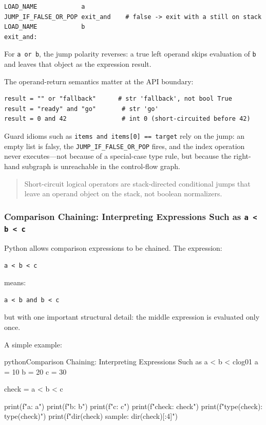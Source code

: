 \begin{verbatim}
LOAD_NAME            a
JUMP_IF_FALSE_OR_POP exit_and    # false -> exit with a still on stack
LOAD_NAME            b
exit_and:
\end{verbatim}

For \texttt{a or b}, the jump polarity reverses: a true left operand skips evaluation of \texttt{b} and leaves that object as the expression result.

The operand-return semantics matter at the API boundary:

\begin{verbatim}
result = "" or "fallback"      # str 'fallback', not bool True
result = "ready" and "go"       # str 'go'
result = 0 and 42               # int 0 (short-circuited before 42)
\end{verbatim}

Guard idioms such as \texttt{items and items[0] == target} rely on the jump: an empty list is falsy, the \texttt{JUMP\_IF\_FALSE\_OR\_POP} fires, and the index operation never executes---not because of a special-case type rule, but because the right-hand subgraph is unreachable in the control-flow graph.

\begin{quote}
Short-circuit logical operators are stack-directed conditional jumps that leave an operand object on the stack, not boolean normalizers.
\end{quote}

\subsubsection{Comparison Chaining: Interpreting Expressions Such as \texttt{a < b < c}}

Python allows comparison expressions to be chained. The expression:

\begin{verbatim}
a < b < c
\end{verbatim}

means:

\begin{verbatim}
a < b and b < c
\end{verbatim}

but with one important structural detail: the middle expression is evaluated only once.

A simple example:

\begin{codebox}[]{python}{Comparison Chaining: Interpreting Expressions Such as a < b < c}{log01}
a = 10
b = 20
c = 30

check = a < b < c

print(f"a: {a}")
print(f"b: {b}")
print(f"c: {c}")
print(f"check: {check}")
print(f"type(check): {type(check)}")
print(f"dir(check) sample: {dir(check)[:4]}")
\end{codebox}


